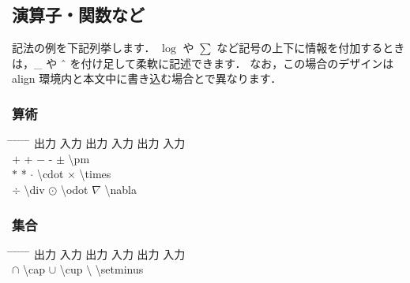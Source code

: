 \documentclass[11pt,a4j,onecolumn]{jsreport} %
\begin{document}
\subsection{演算子・関数など}

記法の例を下記列挙します．
$\log$ や $\sum$ など記号の上下に情報を付加するときは，\_ や \^{~} を付け足して柔軟に記述できます．
なお，この場合のデザインは align 環境内と本文中に書き込む場合とで異なります．

\subsubsection{算術}

\begin{tabbing}
  \hspace{20truemm} \= \hspace{10truemm} \= \hspace{30truemm} \= \hspace{10truemm} \= \hspace{30truemm} \= \hspace{10truemm} \= \hspace{20truemm} \kill
  \> 出力 \> 入力 \> 出力 \> 入力 \> 出力 \> 入力 \\
  \> $+$ \> + \> $-$ \> - \> $\pm$ \> \textbackslash pm \\
  \> $*$ \> * \> $\cdot$ \> \textbackslash cdot \> $\times$ \> \textbackslash times \\
  \> $\div$ \> \textbackslash div \> $\odot$ \> \textbackslash odot \> $\nabla$ \> \textbackslash nabla \\
\end{tabbing}

\subsubsection{集合}

\begin{tabbing}
  \hspace{20truemm} \= \hspace{10truemm} \= \hspace{30truemm} \= \hspace{10truemm} \= \hspace{30truemm} \= \hspace{10truemm} \= \hspace{20truemm} \kill
  \> 出力 \> 入力 \> 出力 \> 入力 \> 出力 \> 入力 \\
  \> $\cap$ \> \textbackslash cap \> $\cup$ \> \textbackslash cup \> $\setminus$ \> \textbackslash setminus \\
\end{tabbing}
\end{document}
